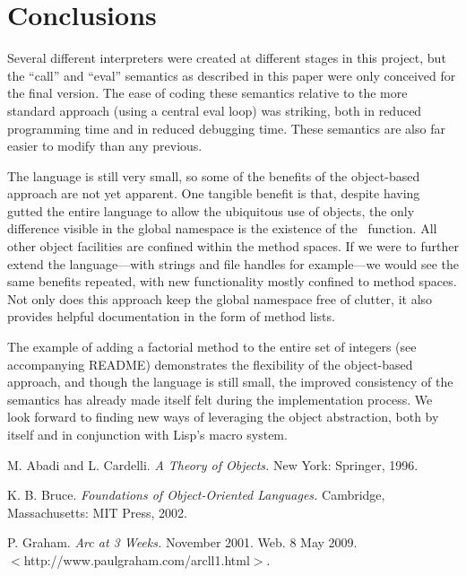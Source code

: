 \documentclass[twocolumn]{article}
\begin{document}
\section*{Conclusions}
Several different interpreters were created at different stages in
this project, but the ``call'' and ``eval'' semantics as described in
this paper were only conceived for the final version. The ease of
coding these semantics relative to the more standard approach (using a
central eval loop) was striking, both in reduced programming time and
in reduced debugging time. These semantics are also far easier to
modify than any previous.

The language is still very small, so some of the benefits of the
object-based approach are not yet apparent. One tangible benefit is
that, despite having gutted the entire language to allow the
ubiquitous use of objects, the only difference visible in the global
namespace is the existence of the \msg\ function. All other object
facilities are confined within the method spaces. If we were to
further extend the language---with strings and file handles for
example---we would see the same benefits repeated, with new
functionality mostly confined to method spaces. Not only does this
approach keep the global namespace free of clutter, it also provides
helpful documentation in the form of method lists.

The example of adding a factorial method to the entire set of integers
(see accompanying README) demonstrates the flexibility of the
object-based approach, and though the language is still small, the
improved consistency of the semantics has already made itself felt
during the implementation process. We look forward to finding new ways
of leveraging the object abstraction, both by itself and in
conjunction with Lisp's macro system.

\begin{thebibliography}{9}
 M. Abadi and L. Cardelli. \textit{A Theory of Objects.} New
  York: Springer, 1996.

 K. B. Bruce. \textit{Foundations of Object-Oriented
    Languages.} Cambridge, Massachusetts: MIT Press, 2002.

 P. Graham. \textit{Arc at 3 Weeks.} November
  2001. Web. 8 May 2009.\\ $<$http://www.paulgraham.com/arcll1.html$>$.
\end{thebibliography}
\end{document}
